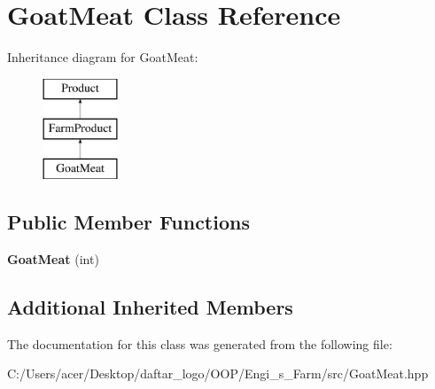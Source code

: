\hypertarget{class_goat_meat}{}\section{Goat\+Meat Class Reference}
\label{class_goat_meat}
Inheritance diagram for Goat\+Meat\+:\begin{figure}[H]
\begin{center}
\leavevmode
\includegraphics[height=3.000000cm]{class_goat_meat}
\end{center}
\end{figure}
\subsection*{Public Member Functions}
\begin{DoxyCompactItemize}
\item 
\mbox{\label{class_goat_meat_afaac7da430315d2638d5d7bdb9a6d003}} 
{\bfseries Goat\+Meat} (int)
\end{DoxyCompactItemize}
\subsection*{Additional Inherited Members}


The documentation for this class was generated from the following file\+:\begin{DoxyCompactItemize}
\item 
C\+:/\+Users/acer/\+Desktop/daftar\+\_\+logo/\+O\+O\+P/\+Engi\+\_\+s\+\_\+\+Farm/src/Goat\+Meat.\+hpp\end{DoxyCompactItemize}

